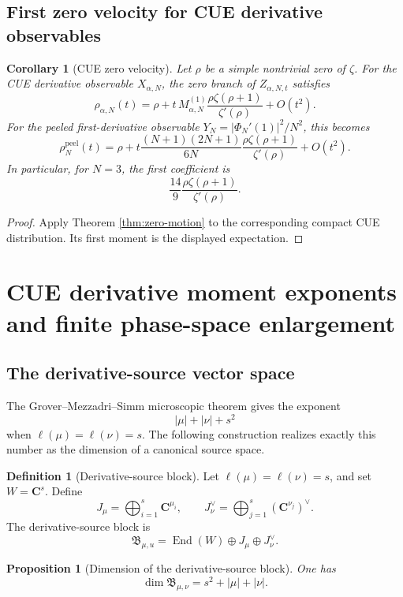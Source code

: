 \documentclass[11pt]{article}
\newcommand{\C}{\mathbf C}
\newcommand{\End}{\operatorname{End}}
\theoremstyle{plain}
\newtheorem{proposition}[theorem]{Proposition}
\newtheorem{corollary}[theorem]{Corollary}
\theoremstyle{definition}
\newtheorem{definition}[theorem]{Definition}
\begin{document}
\subsection{First zero velocity for CUE derivative observables}

\begin{corollary}[CUE zero velocity]\label{cor:cue-zero-velocity}
Let \(\rho\) be a simple nontrivial zero of \(\zeta\).  For the CUE derivative observable \(X_{\alpha,N}\), the zero branch of \(Z_{\alpha,N,t}\) satisfies
\[
   \rho_{\alpha,N}(t)=\rho+
   t\,M_{\alpha,N}^{(1)}\frac{\rho\zeta(\rho+1)}{\zeta'(\rho)}+O(t^2).
\]
For the peeled first-derivative observable \(Y_N=|\Phi_N'(1)|^2/N^2\), this becomes
\[
   \rho_N^{\operatorname{peel}}(t)=\rho+
   t\frac{(N+1)(2N+1)}{6N}\frac{\rho\zeta(\rho+1)}{\zeta'(\rho)}+O(t^2).
\]
In particular, for \(N=3\), the first coefficient is
\[
   \frac{14}{9}\frac{\rho\zeta(\rho+1)}{\zeta'(\rho)}.
\]
\end{corollary}

\begin{proof}
Apply Theorem \ref{thm:zero-motion} to the corresponding compact CUE distribution.  Its first moment is the displayed expectation.
\end{proof}

\section{CUE derivative moment exponents and finite phase-space enlargement}

\subsection{The derivative-source vector space}

The Grover--Mezzadri--Simm microscopic theorem gives the exponent
\[
   |\mu|+|\nu|+s^2
\]
when \(\ell(\mu)=\ell(\nu)=s\).  The following construction realizes exactly this number as the dimension of a canonical source space.

\begin{definition}[Derivative-source block]\label{def:source-block}
Let \(\ell(\mu)=\ell(\nu)=s\), and set \(W=\C^s\).  Define
\[
   J_\mu=\bigoplus_{i=1}^s\C^{\mu_i},
   \qquad
   J_\nu^\vee=\bigoplus_{j=1}^s(\C^{\nu_j})^\vee.
\]
The derivative-source block is
\[
   \mathfrak B_{\mu,
u}=\End(W)\oplus J_\mu\oplus J_\nu^\vee.
\]
\end{definition}

\begin{proposition}[Dimension of the derivative-source block]\label{prop:source-dim}
One has
\[
   \dim \mathfrak B_{\mu,\nu}=s^2+|\mu|+|\nu|.
\]
\end{proposition}
\end{document}
